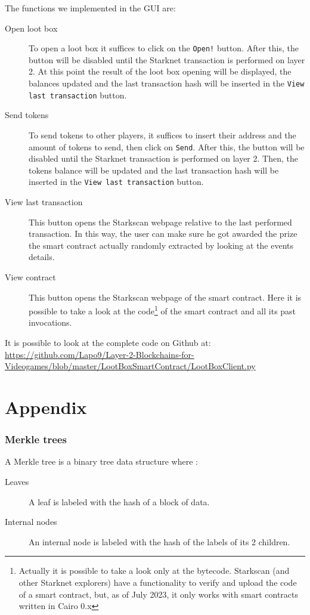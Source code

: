 \documentclass[12pt]{article}
\begin{document}
The functions we implemented in the GUI are:
\begin{description}
    \item[Open loot box] To open a loot box it suffices to click on the \verb|Open!| button. After this, the button will be disabled until the Starknet transaction is performed on layer 2. At this point the result of the loot box opening will be displayed, the balances updated and the last transaction hash will be inserted in the \verb|View last transaction| button.
    \item[Send tokens] To send tokens to other players, it suffices to insert their address and the amount of tokens to send, then click on \verb|Send|. After this, the button will be disabled until the Starknet transaction is performed on layer 2. Then, the tokens balance will be updated and the last transaction hash will be inserted in the \verb|View last transaction| button.
    \item[View last transaction] This button opens the Starkscan webpage relative to the last performed transaction. In this way, the user can make sure he got awarded the prize the smart contract actually randomly extracted by looking at the events details.
    \item[View contract] This button opens the Starkscan webpage of the smart contract. Here it is possible to take a look at the code\footnote{Actually it is possible to take a look only at the bytecode. Starkscan (and other Starknet explorers) have a functionality to verify and upload the code of a smart contract, but, as of July 2023, it only works with smart contracts written in Cairo 0.x} of the smart contract and all its past invocations.
\end{description}

It is possible to look at the complete code on Github at: \url{https://github.com/Lapo9/Layer-2-Blockchains-for-Videogames/blob/master/LootBoxSmartContract/LootBoxClient.py}

\newpage
\part{Appendix} \label{part:appendix}
\section{Merkle trees} \label{section:merkle_trees}
A Merkle tree is a binary tree data structure where \cite{ethereum_merkle_trees}:
\begin{description}
    \item[Leaves] A leaf is labeled with the hash of a block of data.
    \item[Internal nodes] An internal node is labeled with the hash of the labels of its 2 children.
\end{description}
\end{document}
